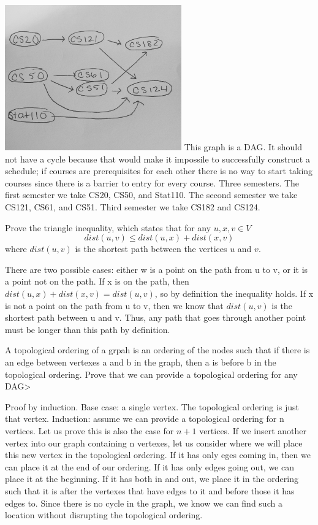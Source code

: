 \documentclass[solution, letterpaper]{cs20inclass}
\begin{document}
\begin{solution}
\subsolution \includegraphics[width=3in]{ClassGraph.jpg}
\subsolution This graph is a DAG. It should not have a cycle because that would make it impossile to successfully construct a schedule; if courses are prerequisites for each other there is no way to start taking courses since there is a barrier to entry for every course. 
\subsolution Three semesters. The first semester we take CS20, CS50, and Stat110. The second semester we take CS121, CS61, and CS51. Third semester we take CS182 and CS124. 


\end{solution}

\problem Prove the triangle inequality, which states that for any $u, x, v \in V$
\[dist(u, v) \le dist(u, x) + dist(x, v)\]
where $dist(u,v)$ is the shortest path between the vertices $u$ and $v$.

\begin{solution}
There are two possible cases: either w is a point on the path from u to v, or it is a point not on the path. If x is on the path, then $dist(u,x) + dist(x,v) = dist(u,v)$, so by definition the inequality holds. If x is not a point on the path from u to v, then we know that $dist(u,v)$ is the shortest path between u and v. Thus, any path that goes through another point must be longer than this path by definition. 
\end{solution}

\problem [BONUS] A topological ordering of a grpah is an ordering of the nodes such that if there is an edge between vertexes a and b in the graph, then a is before b in the topological ordering. Prove that we can provide a topological ordering for any DAG> 

\begin{solution}
Proof by induction. Base case: a single vertex. The topological ordering is just that vertex. Induction: assume we can provide a topological ordering for n vertices. Let us prove this is also the case for $n+1$ vertices. If we insert another vertex into our graph containing n vertexes, let us consider where we will place this new vertex in the topological ordering. If it has only eges coming in, then we can place it at the end of our ordering. If it has only edges going out, we can place it at the beginning. If it has both in and out, we place it in the ordering such that it is after the vertexes that have edges to it and before those it has edges to. Since there is no cycle in the graph, we know we can find such a location without disrupting the topological ordering. 
\end{solution}
\end{document}
